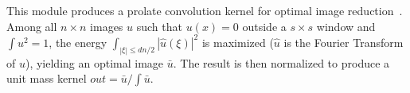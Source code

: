 This module produces a prolate convolution kernel for optimal
image reduction~\cite{landau.pollak:prolate}. 
Among all $n\times n$ images $u$ such that $u(x)=0$ 
outside a $s\times s$ window and $\int u^2=1$, the energy 
$\int_{|\xi|\leq dn/2} |\hat u(\xi)|^2$ is maximized ($\hat u$ is 
the Fourier Transform of $u$), yielding an optimal image $\bar u$.
The result is then normalized to produce a unit mass kernel 
$out= \bar u/\int \bar u$.
